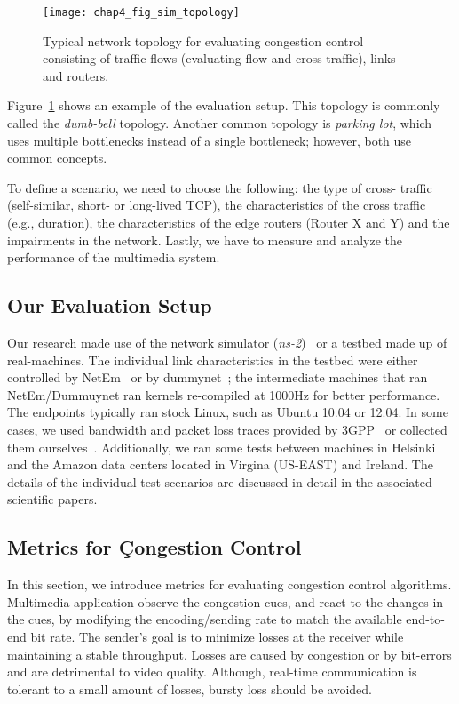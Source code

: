\begin{figure}
\texttt{[image: chap4\_fig\_sim\_topology]}
\caption{Typical network topology for evaluating congestion control consisting
of traffic flows (evaluating flow and cross traffic), links and routers.}
\label{fig:4:topology}
\end{figure}


Figure~\ref{fig:4:topology} shows an example of the evaluation setup. This
topology is commonly called the \emph{dumb-bell} topology. Another common
topology is \emph{parking lot}, which uses multiple bottlenecks instead of a
single bottleneck; however, both use common concepts.


To define a scenario, we need to choose the following: the type of cross-
traffic (self-similar, short- or long-lived TCP), the characteristics of the
cross traffic (e.g., duration), the characteristics of the edge routers
(Router X and Y) and the impairments in the network. Lastly, we have to
measure and analyze the performance of the multimedia system.


\subsection{Our Evaluation Setup}

Our research made use of the network simulator (\emph{ns-2})~\cite{ns2} or a
testbed made up of real-machines. The individual link characteristics in the
testbed were either controlled by NetEm~\cite{netem} or by
dummynet~\cite{Carbone:2010p3502}; the intermediate machines that ran
NetEm/Dummuynet ran kernels re-compiled at 1000Hz for better performance. The
endpoints typically ran stock Linux, such as Ubuntu 10.04 or 12.04. In some
cases, we used bandwidth and packet loss traces provided by
3GPP~\cite{s4.eval.bitrate} or collected them ourselves~\cite{sharmistha-thesis}. 
Additionally, we ran some tests between machines in Helsinki and the
Amazon data centers located in Virgina (US-EAST) and Ireland. The details of the
individual test scenarios are discussed in detail in the associated scientific 
papers.

\subsection{Metrics for Çongestion Control}
\label{subsec.metrics}

In this section, we introduce metrics for evaluating congestion control
algorithms. Multimedia application observe the congestion cues, and react to
the changes in the cues, by modifying the encoding/sending rate to match the
available end-to-end bit rate. The sender's goal is to minimize losses at the
receiver while maintaining a stable throughput. Losses are caused by
congestion or by  bit-errors and are detrimental to video quality. Although,
real-time communication is tolerant to a small amount of losses, bursty loss
should be avoided.  

